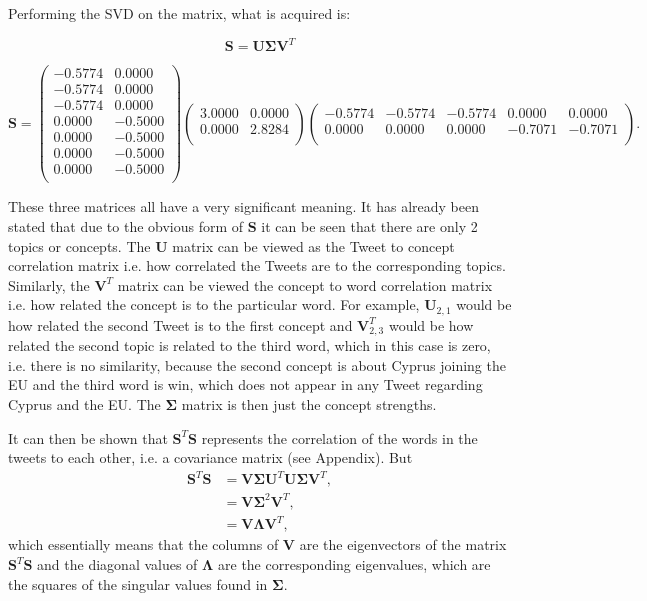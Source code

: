 \documentclass[11pt,a4paper]{article}
\begin{document}
Performing the SVD on the matrix, what is acquired is:

\begin{equation*}
\mathbf{S} = \mathbf{U}\mathbf{\Sigma}\mathbf{V}^T
\end{equation*}

\begin{equation}
\mathbf{S} = \begin{pmatrix}
-0.5774 & 0.0000\\
-0.5774 & 0.0000\\
-0.5774 & 0.0000\\
0.0000 & -0.5000\\
0.0000 & -0.5000\\
0.0000 & -0.5000\\
0.0000 & -0.5000\\
\end{pmatrix}
\begin{pmatrix}
3.0000 & 0.0000\\
0.0000 & 2.8284\\
\end{pmatrix}
\begin{pmatrix}
-0.5774 & -0.5774 & -0.5774 & 0.0000 & 0.0000 \\
0.0000 & 0.0000 & 0.0000 & -0.7071 & -0.7071\\
\end{pmatrix}.
\end{equation}

These three matrices all have a very significant meaning. It has already been stated that due to the obvious form of $\mathbf{S}$ it can be seen that there are only 2 topics or concepts. The $\mathbf{U}$ matrix can be viewed as the Tweet to concept correlation matrix i.e. how correlated the Tweets are to the corresponding topics. Similarly, the $\mathbf{V}^T$ matrix can be viewed  the concept to word correlation matrix i.e. how related the concept is to the particular word. For example, $\mathbf{U}_{2,1}$ would be how related the second Tweet is to the first concept and $\mathbf{V}^T_{2,3}$ would be how related the second topic is related to the third word, which in this case is zero, i.e. there is no similarity, because the second concept is about Cyprus joining the EU and the third word is win, which does not appear in any Tweet regarding Cyprus and the EU. The $\mathbf{\Sigma}$ matrix is then just the concept strengths.

It can then be shown that $\mathbf{S}^T\mathbf{S}$ represents the correlation of the words in the tweets to each other, i.e. a covariance matrix (see Appendix). But 
\begin{align*}
\mathbf{S}^T\mathbf{S} &= \mathbf{V}\mathbf{\Sigma}\mathbf{U}^T \mathbf{U}\mathbf{\Sigma}\mathbf{V}^T,\\
& = \mathbf{V}\mathbf{\Sigma}^2\mathbf{V}^T,\\
& = \mathbf{V}\mathbf{\Lambda}\mathbf{V}^T,
\end{align*}
which essentially means that the columns of $\mathbf{V}$ are the eigenvectors of the matrix $\mathbf{S}^T\mathbf{S}$ and the diagonal values of $\mathbf{\Lambda}$ are the corresponding eigenvalues, which are the squares of the singular values found in $\mathbf{\Sigma}$.
\end{document}
